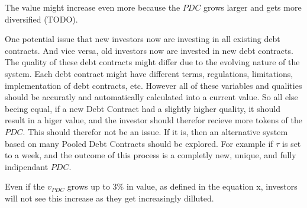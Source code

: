 The value might increase even more because the $PDC$ grows larger and gets more diversified (TODO). 

One potential issue that new investors now are investing in all existing debt contracts. And vice versa, old investors now are invested in new debt contracts. The quality of these debt contracts might differ due to the evolving nature of the system. Each debt contract might have different terms, regulations, limitations, implementation of debt contracts, etc. However all of these variables and qualities should be accuratly and automatically calculated into a current value. So all else beeing equal, if a new Debt Contract had a slightly higher quality, it should result in a higer value, and the investor should therefor recieve more tokens of the $PDC$. This should therefor not be an issue. If it is, then an alternative system based on many Pooled Debt Contracts should be explored. For example if $\tau$ is set to a week, and the outcome of this process is a completly new, unique, and fully indipendant $PDC$. 

Even if the $v_{PDC}$ grows up to 3\% in value, as defined in the equation x, investors will not see this increase as they get increasingly dilluted. 

